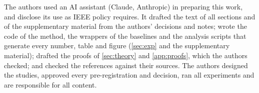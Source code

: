 The authors used an AI assistant (Claude, Anthropic) in preparing this work, and disclose its use as IEEE policy
requires. It drafted the text of all sections and of the supplementary material from the authors' decisions and notes;
wrote the code of the method, the wrappers of the baselines and the analysis scripts that generate every number, table
and figure (\cref{sec:exp} and the supplementary material); drafted the proofs of \cref{sec:theory} and
\cref{app:proofs}, which the authors checked; and checked the references against their sources. The authors designed the
studies, approved every pre-registration and decision, ran all experiments and are responsible for all content.
